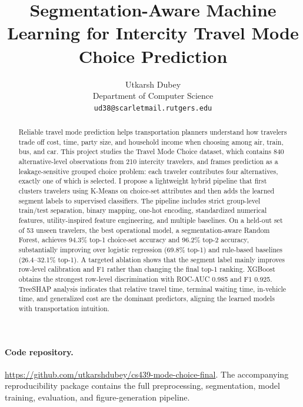 \documentclass{article}
\title{Segmentation-Aware Machine Learning for Intercity Travel Mode Choice Prediction}
\author{%
  Utkarsh Dubey\\
  Department of Computer Science\\
  \texttt{ud38@scarletmail.rutgers.edu}\\
}
\begin{document}
\maketitle

\begin{abstract}
Reliable travel mode prediction helps transportation planners understand how travelers trade off cost, time, party size, and household income when choosing among air, train, bus, and car.  This project studies the Travel Mode Choice dataset, which contains 840 alternative-level observations from 210 intercity travelers, and frames prediction as a leakage-sensitive grouped choice problem: each traveler contributes four alternatives, exactly one of which is selected.  I propose a lightweight hybrid pipeline that first clusters travelers using K-Means on choice-set attributes and then adds the learned segment labels to supervised classifiers.  The pipeline includes strict group-level train/test separation, binary mapping, one-hot encoding, standardized numerical features, utility-inspired feature engineering, and multiple baselines.  On a held-out set of 53 unseen travelers, the best operational model, a segmentation-aware Random Forest, achieves 94.3\% top-1 choice-set accuracy and 96.2\% top-2 accuracy, substantially improving over logistic regression (69.8\% top-1) and rule-based baselines (26.4--32.1\% top-1).  A targeted ablation shows that the segment label mainly improves row-level calibration and F1 rather than changing the final top-1 ranking.  XGBoost obtains the strongest row-level discrimination with ROC-AUC 0.985 and F1 0.925.  TreeSHAP analysis indicates that relative travel time, terminal waiting time, in-vehicle time, and generalized cost are the dominant predictors, aligning the learned models with transportation intuition.
\end{abstract}

\paragraph{Code repository.} \url{https://github.com/utkarshdubey/cs439-mode-choice-final}.  The accompanying reproducibility package contains the full preprocessing, segmentation, model training, evaluation, and figure-generation pipeline.
\end{document}
